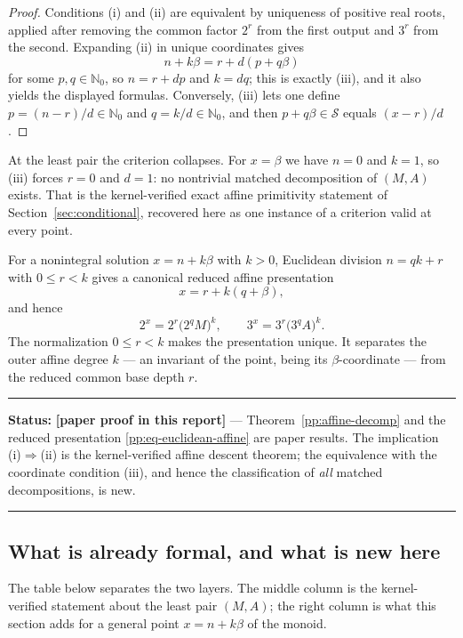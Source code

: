 \documentclass[11pt,oneside]{article}
\theoremstyle{definition}
\theoremstyle{remark}
\newcommand{\Nzero}{\mathbb N_0}
\newcommand{\Sol}{\mathcal S}
\newcommand{\statusnew}{\textcolor{newgreen}{\textbf{[paper proof in this report]}}}
\newenvironment{statusbox}[1]
{\begin{center}\begin{minipage}{0.94\textwidth}\raggedright\hbadness=10000\hrule
\vspace{0.45em}\textbf{Status:} #1\par\vspace{0.35em}}
{\vspace{0.35em}\hrule\end{minipage}\end{center}}
\begin{document}
\begin{proof}
Conditions (i) and (ii) are equivalent by uniqueness of positive real roots, applied after
removing the common factor $2^r$ from the first output and $3^r$ from the second.  Expanding
(ii) in unique coordinates gives
\[
 n+k\beta=r+d(p+q\beta)
\]
for some $p,q\in\Nzero$, so $n=r+dp$ and $k=dq$; this is exactly (iii), and it also yields the
displayed formulas.  Conversely, (iii) lets one define $p=(n-r)/d\in\Nzero$ and
$q=k/d\in\Nzero$, and then $p+q\beta\in\Sol$ equals $(x-r)/d$.
\end{proof}

At the least pair the criterion collapses.  For $x=\beta$ we have $n=0$ and $k=1$, so (iii)
forces $r=0$ and $d=1$: no nontrivial matched decomposition of $(M,A)$ exists.  That is the
kernel-verified exact affine primitivity statement of Section~\ref{sec:conditional}, recovered
here as one instance of a criterion valid at every point.

For a nonintegral solution $x=n+k\beta$ with $k>0$, Euclidean division $n=qk+r$ with
$0\le r<k$ gives a canonical reduced affine presentation
\begin{equation}
 x=r+k(q+\beta),
\label{pp:eq-euclidean-affine}
\end{equation}
and hence
\[
 2^x=2^r\bigl(2^qM\bigr)^k,
 \qquad
 3^x=3^r\bigl(3^qA\bigr)^k .
\]
The normalization $0\le r<k$ makes the presentation unique.  It separates the outer affine
degree $k$ --- an invariant of the point, being its $\beta$-coordinate --- from the reduced
common base depth $r$.

\begin{statusbox}{\statusnew{} --- Theorem~\ref{pp:affine-decomp} and the reduced presentation
\eqref{pp:eq-euclidean-affine} are paper results.  The implication (i)$\Rightarrow$(ii) is the
kernel-verified affine descent theorem; the equivalence with the coordinate condition (iii),
and hence the classification of \emph{all} matched decompositions, is new.}
\end{statusbox}

\subsection{What is already formal, and what is new here}

The table below separates the two layers.  The middle column is the kernel-verified statement
about the least pair $(M,A)$; the right column is what this section adds for a general point
$x=n+k\beta$ of the monoid.
\end{document}
